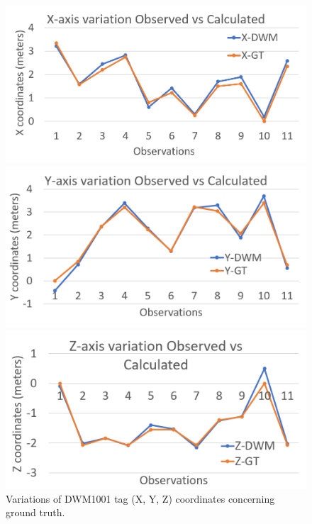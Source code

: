 \documentclass{IEEEtran}
\begin{document}
\begin{figure}[htb]
\centering
\includegraphics[width=1\linewidth]{fig/uwb_x_graph.png}

\centering
\includegraphics[width=1\linewidth]{fig/uwb_y_graph.png}

\centering
\includegraphics[width=1\linewidth]{fig/uwb_z_graph.png}
\caption{Variations of DWM1001 tag (X, Y, Z) coordinates concerning ground truth.} \label{fig.structure}
\end{figure}
\end{document}
